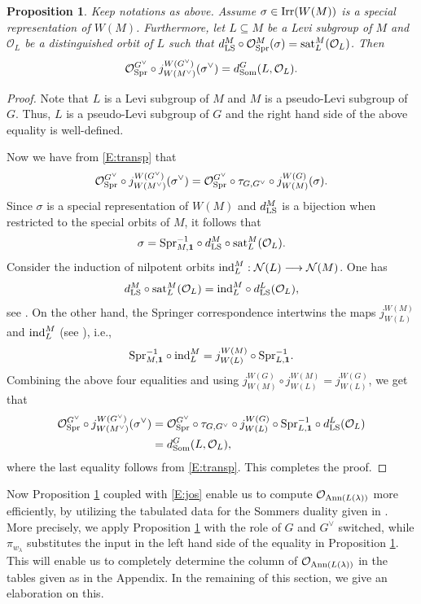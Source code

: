 \documentclass[reqno,12pt]{amsart}
\numberwithin{equation}{section}
\theoremstyle{plain}
\newtheorem{Prop}[Thm]{Proposition}
\theoremstyle{definition}
\renewcommand{\subset}{\subseteq}
\begin{document}
\begin{Prop} \label{P:Som}
Keep notations as above. Assume $\sigma \in {\rm Irr}(W(M))$ is a special representation of $W(M)$. Furthermore, let $L\subset M$ be a Levi subgroup of $M$ and $\mathcal{O}_L$ be a distinguished orbit of $L$ such that $d_{\rm LS}^M \circ \mathcal{O}_{\rm Spr}^M(\sigma) = {\rm sat}_L^M(\mathcal{O}_L)$.
Then 
$$\mathcal{O}_{\rm Spr}^{G^\vee} \circ j_{W(M^\vee)}^{W(G^\vee)}(\sigma^\vee) = d_{\rm Som}^G(L, \mathcal{O}_L).$$
\end{Prop}
\begin{proof}
Note that $L$ is a Levi subgroup of $M$ and $M$ is a pseudo-Levi subgroup of $G$. Thus, $L$ is a pseudo-Levi subgroup of $G$ and the right hand side of the above equality is well-defined.

Now we have from \eqref{E:transp} that
$$\mathcal{O}_{\rm Spr}^{G^\vee} \circ j_{W(M^\vee)}^{W(G^\vee)}(\sigma^\vee) = \mathcal{O}_{\rm Spr}^{G^\vee} \circ \tau_{G, G^\vee} \circ j_{W(M)}^{W(G)} (\sigma).$$
Since $\sigma$ is a special representation of $W(M)$ and $d_{\rm LS}^M$ is a bijection when restricted to the special orbits of $M$, it follows that
$$\sigma = {\rm Spr}_{M, \mathbf{1}}^{-1} \circ d_{\rm LS}^M \circ {\rm sat}_{L}^M(\mathcal{O}_L).$$
Consider the induction of nilpotent orbits ${\rm ind}_L^M: \mathcal{N}(L) \longrightarrow \mathcal{N}(M)$. One has
$$d_{\rm LS}^M \circ {\rm sat}_L^M(\mathcal{O}_L) = {\rm ind}_L^M \circ d_{\rm LS}^L(\mathcal{O}_L),$$
see \cite[Theorem 8.3.1]{CM}. On the other hand, the Springer correspondence intertwins the maps  $j_{W(L)}^{W(M)}$ and ${\rm ind}_L^M$ (see \cite{LuSp1}), i.e.,
$${\rm Spr}_{M, \mathbf{1}}^{-1} \circ {\rm ind}_L^M = j_{W(L)}^{W(M)} \circ {\rm Spr}_{L, \mathbf{1}}^{-1}.$$
Combining the above four equalities and using  $j_{W(M)}^{W(G)} \circ j_{W(L)}^{W(M)} = j_{W(L)}^{W(G)}$, we get that
$$
\begin{aligned}
    \mathcal{O}_{\rm Spr}^{G^\vee} \circ j_{W(M^\vee)}^{W(G^\vee)}(\sigma^\vee) & = \mathcal{O}_{\rm Spr}^{G^\vee} \circ \tau_{G, G^\vee} \circ j_{W(L)}^{W(G)} \circ {\rm Spr}_{L, \mathbf{1}}^{-1} \circ d_{\rm LS}^L (\mathcal{O}_L) \\
     & = d_{\rm Som}^G(L, \mathcal{O}_L),
\end{aligned}$$
where the last equality follows from \eqref{E:transp}. This completes the proof.
\end{proof}



Now Proposition \ref{P:Som} coupled with \eqref{E:jos} enable us to compute $\mathcal{O}_{{\rm Ann}(L(\lambda))}$ more efficiently, by utilizing the tabulated data for the Sommers duality given in \cite{Sommers, ac03}. More precisely, we apply Proposition \ref{P:Som} with the role of $G$ and $G^\vee$ switched, while $\pi_{w_\lambda}$ substitutes the input in the left hand side of the equality in Proposition \ref{P:Som}.  This will enable us to completely determine the column of $\mathcal{O}_{{\rm Ann}(L(\lambda))}$ in the tables given as in the Appendix. In the remaining of this section, we give an elaboration on this.
\end{document}
